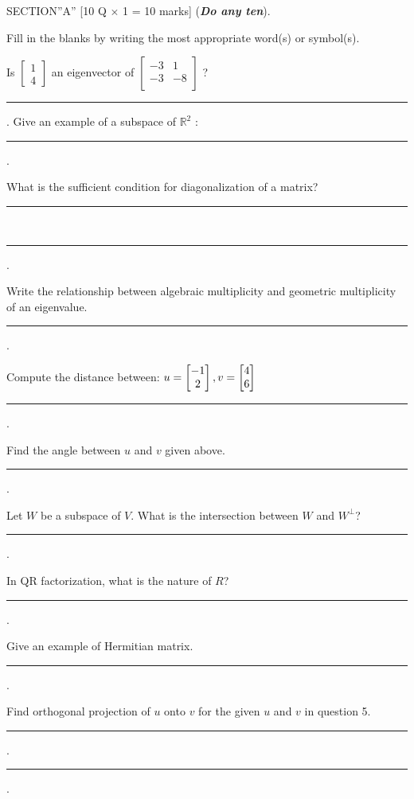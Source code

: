 \documentclass[12pt]{exam}
\begin{document}
\begin{center}
  SECTION''A'' \hspace{5mm} [10 Q \(\times\) 1 = 10 marks] (\textbf{\textit{Do any ten}}).
\end{center}
Fill in the blanks by writing the most appropriate word(s) or symbol(s).
\begin{questions}
\question Is $
  \begin{bmatrix}
    1 \\ 4
  \end{bmatrix}$ an eigenvector of $\begin{bmatrix} -3 & 1  \\  -3 & -8  \\ \end{bmatrix}$ ? \rule{7cm}{0.15mm}.
\question Give an example of a subspace of $\mathbb{R}^2$ : \rule{8cm}{0.15mm}.

\question What is the sufficient condition for diagonalization of a matrix? \rule{4cm}{0.15mm} \\[1mm]
\rule{9cm}{0.15mm}.

\question Write the relationship between algebraic multiplicity and geometric multiplicity of an eigenvalue. \rule{8cm}{0.15mm}.

\question Compute the distance between: $u=
  \begin{bmatrix}
    -1 \\ 2
  \end{bmatrix}, \vspace{4mm}
   v=
   \begin{bmatrix}
     4 \\6
   \end{bmatrix}$ \rule{7cm}{0.15mm}.

\question Find the angle between $u$ and $v$ given above. \rule{7cm}{0.15mm}.

\question Let $W$ be a subspace of $V$. What is the intersection between $W$ and $W^{\perp}$? \rule{3cm}{0.15mm}.

\question In QR factorization, what is the nature of $R$? \rule{7cm}{0.15mm}.
\vspace{2mm}

\question Give an example of Hermitian matrix. \rule{7cm}{0.15mm}.

\question Find orthogonal projection of $u$ onto $v$ for the given $u$ and $v$ in question 5. \rule{3cm}{0.15mm}. \\[1mm]
\rule{7cm}{0.15mm}.
\end{questions}
\end{document}
